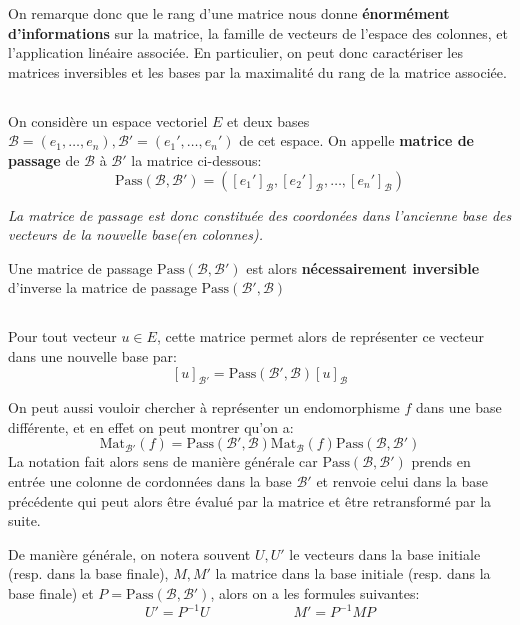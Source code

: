 On remarque donc que le rang d'une matrice nous donne \textbf{énormément d'informations} sur la matrice, la famille de vecteurs de l'espace des colonnes, et l'application linéaire associée. En particulier, on peut donc caractériser les matrices inversibles et les bases par la maximalité du rang de la matrice associée.
\subsection*{}

On considère un espace vectoriel \(E\) et deux bases \(\mathscr{B} =(e_1, \ldots, e_n), \mathscr{B}'=({e}_1', \ldots, {e}_n')\) de cet espace.\+
On appelle \textbf{matrice de passage} de \(\mathscr{B}\) à \(\mathscr{B}'\) la matrice ci-dessous:
\[ 
   \text{Pass}(\mathscr{B}, \mathscr{B}') = ([e_1']_{\mathscr{B}}, [e_2']_{\mathscr{B}}, \ldots, [e_n']_{\mathscr{B}}) 
\]

\begin{center}
   \textit{
      La matrice de passage est donc constituée des coordonées dans l'ancienne base des vecteurs de la nouvelle base(en colonnes).
   }
\end{center}
Une matrice de passage \( \text{Pass}(\mathscr{B}, \mathscr{B}') \) est alors \textbf{nécessairement inversible} d'inverse la matrice de passage \( \text{Pass}(\mathscr{B}', \mathscr{B}) \)
\subsection*{}
Pour tout vecteur \( u \in E \), cette matrice permet alors de représenter ce vecteur dans une nouvelle base par:
\[ 
   [u]_{ \mathscr{B}'} = \text{Pass}(\mathscr{B}', \mathscr{B})[u]_{\mathscr{B}} 
\]

On peut aussi vouloir chercher à représenter un endomorphisme \( f \) dans une base différente, et en effet on peut montrer qu'on a:
\[ 
   \text{Mat}_{ \mathscr{B}'}(f) = \text{Pass}(\mathscr{B}', \mathscr{B}) \text{Mat}_{\mathscr{B}}(f) \text{Pass}(\mathscr{B}, \mathscr{B}')
\]
La notation fait alors sens de manière générale car \( \text{Pass}(\mathscr{B}, \mathscr{B}') \) prends en entrée une colonne de cordonnées dans la base \(\mathscr{B}'\) et renvoie celui dans la base précédente qui peut alors être évalué par la matrice et être retransformé par la suite.\<

De manière générale, on notera souvent \(U, U'\) le vecteurs dans la base initiale (resp. dans la base finale), \( M, M' \) la matrice dans la base initiale (resp. dans la base finale) et \( P = \text{Pass}( \mathscr{B}, \mathscr{B}') \), alors on a les formules suivantes:
\[ 
   U' = P^{-1}U \quad\quad\quad\quad\quad\quad M' = P^{-1}MP
\]

